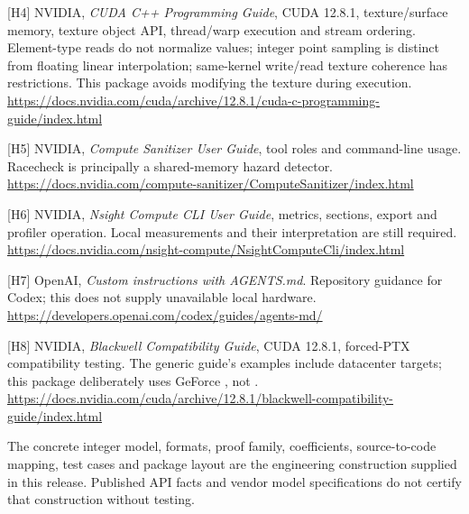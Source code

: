 \documentclass[11pt,a4paper]{article}
\begin{document}
{[}H4{]} NVIDIA, \emph{CUDA C++ Programming Guide}, CUDA 12.8.1, texture/surface memory, texture object API, thread/warp execution and stream ordering. Element-type reads do not normalize values; integer point sampling is distinct from floating linear interpolation; same-kernel write/read texture coherence has restrictions. This package avoids modifying the texture during execution. \url{https://docs.nvidia.com/cuda/archive/12.8.1/cuda-c-programming-guide/index.html}

{[}H5{]} NVIDIA, \emph{Compute Sanitizer User Guide}, tool roles and command-line usage. Racecheck is principally a shared-memory hazard detector. \url{https://docs.nvidia.com/compute-sanitizer/ComputeSanitizer/index.html}

{[}H6{]} NVIDIA, \emph{Nsight Compute CLI User Guide}, metrics, sections, export and profiler operation. Local measurements and their interpretation are still required. \url{https://docs.nvidia.com/nsight-compute/NsightComputeCli/index.html}

{[}H7{]} OpenAI, \emph{Custom instructions with AGENTS.md}. Repository guidance for Codex; this does not supply unavailable local hardware. \url{https://developers.openai.com/codex/guides/agents-md/}

{[}H8{]} NVIDIA, \emph{Blackwell Compatibility Guide}, CUDA 12.8.1, forced-PTX compatibility testing. The generic guide's examples include datacenter targets; this package deliberately uses GeForce , not . \url{https://docs.nvidia.com/cuda/archive/12.8.1/blackwell-compatibility-guide/index.html}

The concrete integer model, formats, proof family, coefficients, source-to-code mapping, test cases and package layout are the engineering construction supplied in this release. Published API facts and vendor model specifications do not certify that construction without testing.

\endgroup
\end{document}
